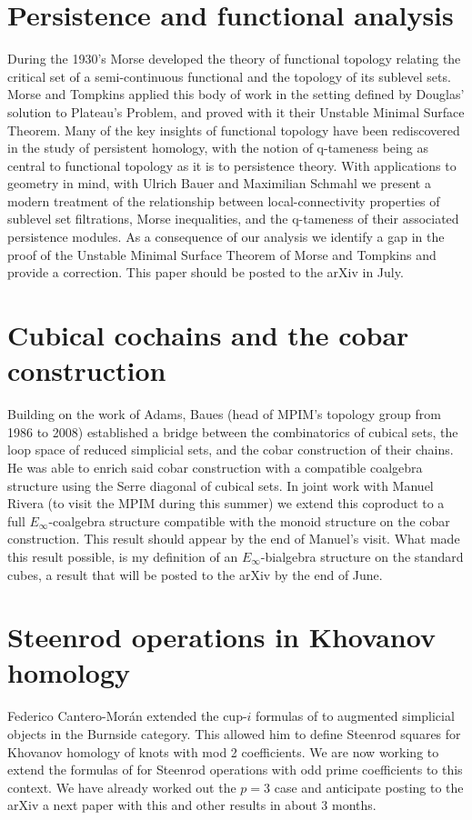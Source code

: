 \documentclass{amsart}
\theoremstyle{definition}
\begin{document}
	\section{Persistence and functional analysis}
	During the 1930's Morse developed the theory of functional topology relating the critical set of a semi-continuous functional and the topology of its sublevel sets.
	Morse and Tompkins applied this body of work in the setting defined by Douglas' solution to Plateau's Problem, and proved with it their Unstable Minimal Surface Theorem.
	Many of the key insights of functional topology have been rediscovered in the study of persistent homology, with the notion of q-tameness being as central to functional topology as it is to persistence theory.
	With applications to geometry in mind, with Ulrich Bauer and Maximilian Schmahl we present a modern treatment of the relationship between local-connectivity properties of sublevel set filtrations, Morse inequalities, and the q-tameness of their associated persistence modules.
	As a consequence of our analysis we identify a gap in the proof of the Unstable Minimal Surface Theorem of Morse and Tompkins and provide a correction.
	This paper should be posted to the arXiv in July.
	
	\section{Cubical cochains and the cobar construction}
	Building on the work of Adams, Baues (head of MPIM's topology group from 1986 to 2008) established a bridge between the combinatorics of cubical sets, the loop space of reduced simplicial sets, and the cobar construction of their chains.
	He was able to enrich said cobar construction with a compatible coalgebra structure using the Serre diagonal of cubical sets.
	In joint work with Manuel Rivera (to visit the MPIM during this summer) we extend this coproduct to a full $E_\infty$-coalgebra structure compatible with the monoid structure on the cobar construction. This result should appear by the end of Manuel's visit.
	What made this result possible, is my definition of an $E_\infty$-bialgebra structure on the standard cubes, a result that will be posted to the arXiv by the end of June.
	
	\section{Steenrod operations in Khovanov homology}
	Federico Cantero-Mor\'an extended the cup-$i$ formulas of \cite{medina2021newformulas} to augmented simplicial objects in the Burnside category.
	This allowed him to define Steenrod squares for Khovanov homology of knots with mod 2 coefficients.
	We are now working to extend the formulas of \cite{medina2020odd} for Steenrod operations with odd prime coefficients to this context.
	We have already worked out the $p=3$ case and anticipate posting to the arXiv a next paper with this and other results in about 3 months.
	
\end{document}
